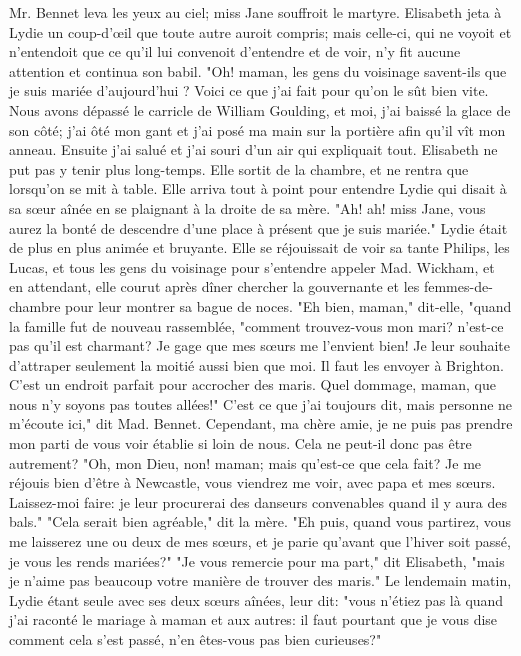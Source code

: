 Mr. Bennet leva les yeux au ciel; miss Jane souffroit le martyre. Elisabeth jeta à Lydie un coup-d'œil que toute autre auroit compris; mais celle-ci, qui ne voyoit et n'entendoit que ce qu'il lui convenoit d'entendre et de voir, n'y fit aucune attention et continua son babil. "Oh! maman, les gens du voisinage savent-ils que je suis mariée d'aujourd'hui ? Voici ce que j'ai fait pour\setcounter{page}{123} qu'on le sût bien vite. Nous avons dépassé le carricle de William Goulding, et moi, j'ai baissé la glace de son côté; j'ai ôté mon gant et j'ai posé ma main sur la portière afin qu'il vît mon anneau. Ensuite j'ai salué et j'ai souri d'un air qui expliquait tout.
Elisabeth ne put pas y tenir plus long-temps. Elle sortit de la chambre, et ne rentra que lorsqu'on se mit à table. Elle arriva tout à point pour entendre Lydie qui disait à sa sœur aînée en se plaignant à la droite de sa mère. "Ah! ah! miss Jane, vous aurez la bonté de descendre d'une place à présent que je suis mariée."
Lydie était de plus en plus animée et bruyante. Elle se réjouissait de voir sa tante Philips, les Lucas, et tous les gens du voisinage pour s'entendre appeler Mad. Wickham, et en attendant, elle courut après dîner chercher la gouvernante et les femmes-de-chambre pour leur montrer sa bague de noces.
"Eh bien, maman," dit-elle, "quand la famille fut de nouveau rassemblée, "comment trouvez-vous mon mari? n'est-ce pas qu'il est charmant? Je gage que mes sœurs me l'envient bien! Je leur souhaite d'attraper seulement la moitié aussi bien que moi. Il faut\setcounter{page}{124} les envoyer à Brighton. C'est un endroit parfait pour accrocher des maris. Quel dommage, maman, que nous n'y soyons pas toutes allées!"
C'est ce que j'ai toujours dit, mais personne ne m'écoute ici," dit Mad. Bennet. Cependant, ma chère amie, je ne puis pas prendre mon parti de vous voir établie si loin de nous. Cela ne peut-il donc pas être autrement?
"Oh, mon Dieu, non! maman; mais qu'est-ce que cela fait? Je me réjouis bien d'être à Newcastle, vous viendrez me voir, avec papa et mes sœurs. Laissez-moi faire: je leur procurerai des danseurs convenables quand il y aura des bals."
"Cela serait bien agréable," dit la mère. "Eh puis, quand vous partirez, vous me laisserez une ou deux de mes sœurs, et je parie qu'avant que l'hiver soit passé, je vous les rends mariées?"
"Je vous remercie pour ma part," dit Elisabeth, "mais je n'aime pas beaucoup votre manière de trouver des maris."
Le lendemain matin, Lydie étant seule avec ses deux sœurs aînées, leur dit: "vous n'étiez pas là quand j'ai raconté le mariage à maman et aux autres: il faut pourtant que je vous dise comment cela s'est passé, n'en êtes-vous pas bien curieuses?"
